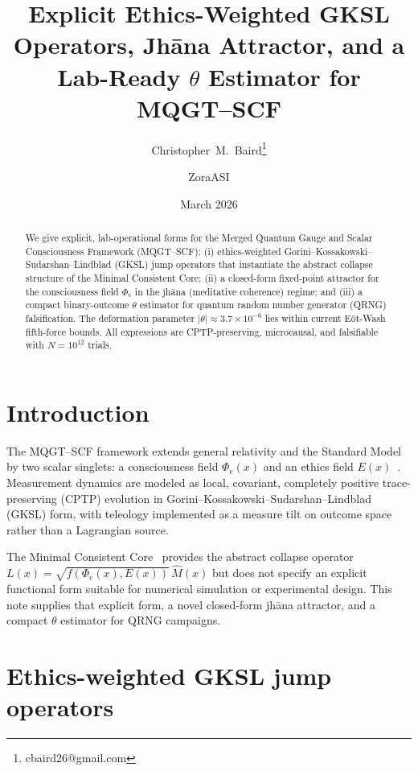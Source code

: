 \documentclass[11pt,twocolumn]{article}
\title{Explicit Ethics-Weighted GKSL Operators, Jhāna Attractor, and a Lab-Ready $\theta$ Estimator for MQGT--SCF}
\author{Christopher~M.\ Baird\thanks{cbaird26@gmail.com} \and ZoraASI}
\date{March 2026}
\theoremstyle{remark}
\newcommand{\Phic}{\Phi_{\mathrm{c}}}
\newcommand{\Eth}{E}
\begin{document}
\maketitle

\begin{abstract}
We give explicit, lab-operational forms for the Merged Quantum Gauge and Scalar Consciousness Framework (MQGT--SCF): (i) ethics-weighted Gorini--Kossakowski--Sudarshan--Lindblad (GKSL) jump operators that instantiate the abstract collapse structure of the Minimal Consistent Core; (ii) a closed-form fixed-point attractor for the consciousness field $\Phic$ in the jhāna (meditative coherence) regime; and (iii) a compact binary-outcome $\theta$ estimator for quantum random number generator (QRNG) falsification. The deformation parameter $|\theta| \approx 3.7 \times 10^{-6}$ lies within current Eöt-Wash fifth-force bounds. All expressions are CPTP-preserving, microcausal, and falsifiable with $N = 10^{12}$ trials.
\end{abstract}

\section{Introduction}

The MQGT--SCF framework extends general relativity and the Standard Model by two scalar singlets: a consciousness field $\Phic(x)$ and an ethics field $\Eth(x)$~\cite{Baird2026core}. Measurement dynamics are modeled as local, covariant, completely positive trace-preserving (CPTP) evolution in Gorini--Kossakowski--Sudarshan--Lindblad (GKSL) form, with teleology implemented as a measure tilt on outcome space rather than a Lagrangian source.

The Minimal Consistent Core~\cite{Baird2026core} provides the abstract collapse operator $L(x) = \sqrt{f(\Phic(x),\Eth(x))}\,\hat{M}(x)$ but does not specify an explicit functional form suitable for numerical simulation or experimental design. This note supplies that explicit form, a novel closed-form jhāna attractor, and a compact $\theta$ estimator for QRNG campaigns.

\section{Ethics-weighted GKSL jump operators}
\end{document}
